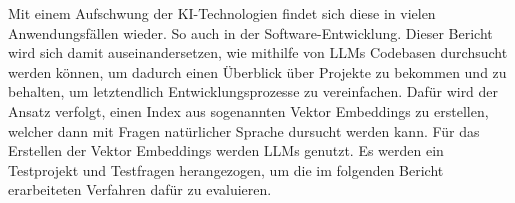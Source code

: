\documentclass[../main.tex]{subfiles}
\begin{document}
Mit einem Aufschwung der KI-Technologien findet sich diese in vielen Anwendungsfällen wieder.
So auch in der Software-Entwicklung.
Dieser Bericht wird sich damit auseinandersetzen, wie mithilfe von \glspl{LLM} Codebasen durchsucht werden können, um dadurch einen Überblick über Projekte zu bekommen und zu behalten, um letztendlich Entwicklungsprozesse zu vereinfachen.
Dafür wird der Ansatz verfolgt, einen Index aus sogenannten Vektor Embeddings zu erstellen, welcher dann mit Fragen natürlicher Sprache dursucht werden kann.
Für das Erstellen der Vektor Embeddings werden \glspl{LLM} genutzt.
Es werden ein Testprojekt und Testfragen herangezogen, um die im folgenden Bericht erarbeiteten Verfahren dafür zu evaluieren.
\end{document}
